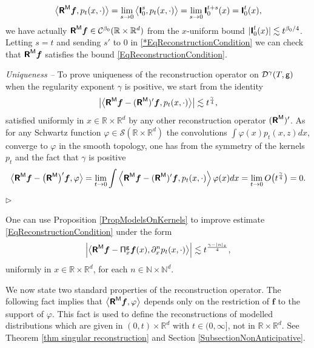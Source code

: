 \documentclass[10pt, reqno]{amsart}
\numberwithin{subsection}{section}
\numberwithin{subsubsection}{subsection}
\numberwithin{equation}{section} %
\newenvironment{Dem}[1][\unskip]{%
    \begin{list}{\hspace{1.15cm}{\sf \textbf{{\small Proof #1 --}}}}{%
        \setlength{\topsep}{0pt}%
        \setlength{\leftmargin}{0pt}%
        \setlength{\rightmargin}{0pt}%
        \setlength{\listparindent}{0pt}%
        \setlength{\itemindent}{0pt}%
        \setlength{\parsep}{0pt}%
        \addtolength{\leftmargin}{0pt}%
        \addtolength{\rightmargin}{0pt}%
    } \item }{\hfill $\rhd$\end{list}\smallskip}
\theoremstyle{mystyle}
\theoremstyle{mystyle2}
\theoremstyle{mystyle3}
\newcommand{\bsf}{\boldsymbol{f}}
\newcommand\bbN{\mathbb{N}}
\newcommand\bbR{\mathbb{R}}
\newcommand{\mcC}{\mathcal{C}}
\newcommand{\mcD}{\mathcal{D}}
\newcommand\mcS{\mathcal{S}}
\begin{document}
\begin{Dem}
$$
\big\langle \textbf{\textsf{R}}^{\sf M}\bsf, p_t(x,\cdot) \big\rangle = 
\lim_{s\to0} \big\langle \textbf{\textsf{I}}_0^{s} , p_t(x,\cdot) \big\rangle = \lim_{s\to0} \textbf{\textsf{I}}_0^{t+s}(x) = \textbf{\textsf{I}}_0^{t}(x),
$$
we have actually $\textbf{\textsf{R}}^{\sf M}\bsf\in\mcC^{\beta_0}(\bbR\times\bbR^d)$ from the $x$-uniform bound $\vert \textbf{\textsf{I}}_0^{t}(x) \vert \lesssim t^{\beta_0/4}$. Letting $s=t$ and sending $s'$ to $0$ in \eqref{*EqReconstructionCondition} we can check that $\textbf{\textsf{R}}^{\sf M}\bsf$ satisfies the bound \eqref{EqReconstructionCondition}. 

\smallskip

{\it Uniqueness -- } To prove uniqueness of the reconstruction operator on $\mcD^\gamma(T,\sf g)$ when the regularity exponent $\gamma$ is positive, we start from the identity
$$
\big\vert \big\langle\textbf{\textsf{R}}^{\sf M}\bsf - (\textbf{\textsf{R}}^{\sf M})'\bsf , p_t(x,\cdot)\big\rangle\big\vert \lesssim t^{\frac\gamma4},
$$
satisfied uniformly in $x\in\bbR\times\bbR^d$ by any other reconstruction 
operator $(\textbf{\textsf{R}}^{\sf M})'$. As for any Schwartz function $\varphi\in\mcS(\bbR\times\bbR^d)$ the convolutions $\int \varphi(x)p_t(x,z)dx$, converge to $\varphi$ in the smooth topology, one has from the symmetry of the kernels $p_t$ and the fact that $\gamma$ is positive
$$
\big\langle \textbf{\textsf{R}}^{\sf M}\bsf - \big(\textbf{\textsf{R}}^{\sf M}\big)'\bsf , \varphi \big\rangle = \underset{t\rightarrow 0}{\lim} 
\int \Big\langle  \textbf{\textsf{R}}^{\sf M}\bsf - (\textbf{\textsf{R}}^{\sf M})'\bsf , p_t(x,\cdot) \Big\rangle\,\varphi(x)dx = \underset{t\rightarrow 0}{\lim} \, O\big(t^{\frac\gamma4}\big) = 0.
$$
\end{Dem}

\medskip

One can use Proposition \ref{PropModelsOnKernels} to improve estimate \eqref{EqReconstructionCondition} under the form
\begin{equation} \label{EqImprovedReconstructionEstimate}
\Big|\big\langle \textsf{\textbf{R}}^{\sf M}\bsf - {\sf\Pi}_x^{\sf g}\bsf(x) , \partial_x^n p_t(x,\cdot)\big\rangle\Big|  \lesssim t^{\frac{\gamma-\vert n\vert_\frak{s}}{4}},
\end{equation}
uniformly in $x\in\bbR\times\bbR^d$, for each $n\in\bbN\times\bbN^d$. 

We now state two standard properties of the reconstruction operator. The following fact implies that $\big\langle\textbf{\textsf{R}}^{\sf M}\bsf , \varphi\big\rangle$ depends only on the restriction of $\bsf$ to the support of $\varphi$. This fact is used to define the reconstructions of modelled distributions which are given in $(0,t)\times\mathbb{R}^d$ with $t\in(0,\infty]$, not in $\bbR\times\bbR^d$. See Theorem \ref{thm singular reconstruction} and Section \ref{SubsectionNonAnticipative}.
\end{document}
